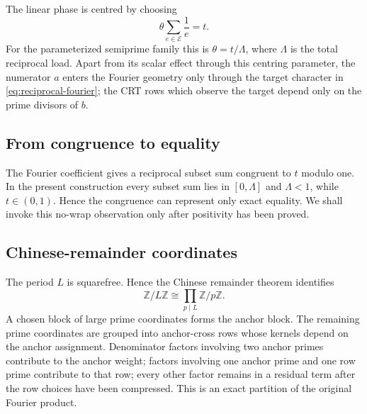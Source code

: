 The linear phase is centred by choosing
\begin{equation}
\label{eq:theta-centering}
 \theta\sum_{e\in\mathcal E}\frac1e=t.
\end{equation}
For the parameterized semiprime family this is $\theta=t/\Lambda$, where $\Lambda$ is the total reciprocal load. Apart from its scalar effect through this centring parameter, the numerator $a$ enters the Fourier geometry only through the target character in \cref{eq:reciprocal-fourier}; the CRT rows which observe the target depend only on the prime divisors of $b$.

\subsection{From congruence to equality}

The Fourier coefficient gives a reciprocal subset sum congruent to $t$ modulo one. In the present construction every subset sum lies in $[0,\Lambda]$ and $\Lambda<1$, while $t\in(0,1)$. Hence the congruence can represent only exact equality. We shall invoke this no-wrap observation only after positivity has been proved.

\subsection{Chinese-remainder coordinates}

The period $L$ is squarefree. Hence the Chinese remainder theorem identifies
\[
 \mathbb Z/L\mathbb Z\cong\prod_{p\mid L}\mathbb Z/p\mathbb Z.
\]
A chosen block of large prime coordinates forms the anchor block. The remaining prime coordinates are grouped into anchor-cross rows whose kernels depend on the anchor assignment. Denominator factors involving two anchor primes contribute to the anchor weight; factors involving one anchor prime and one row prime contribute to that row; every other factor remains in a residual term after the row choices have been compressed. This is an exact partition of the original Fourier product.
